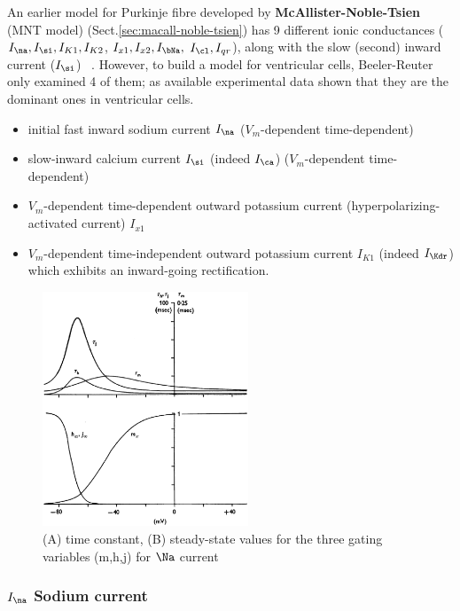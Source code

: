 An earlier model for Purkinje fibre developed by {\bf McAllister-Noble-Tsien}
(MNT model) (Sect.\ref{sec:macall-noble-tsien}) has 9 different ionic
conductances ($I_\na, I_\si, I_{K1}, I_{K2}$, $I_{x1}, I_{x2}, I_\bNa,$
$I_{\cl}, I_{qr}$), along with the slow (second) inward current ($I_\si$)
~\citep{mcallister1975rea}.  However, to build a model for ventricular cells,
Beeler-Reuter only examined 4 of them; as available experimental data shown that
they are the dominant ones in ventricular cells.
\begin{itemize}
\item initial fast inward sodium current $I_\na$ ($V_m$-dependent
time-dependent)
\item slow-inward calcium current $I_\si$ (indeed $I_\ca$) ($V_m$-dependent
time-dependent) 
\item $V_m$-dependent time-dependent outward potassium current
(hyperpolarizing-activated current) $I_{x1}$
\item $V_m$-dependent time-independent outward potassium current
  $I_{K1}$ (indeed $I_\Kdr$) which exhibits an inward-going rectification.
\end{itemize}


\begin{figure}[hbt]
  \centerline{\includegraphics[height=7cm,
    angle=0]{./images/BR_mhj.eps}}
  \caption{(A) time constant, (B) steady-state values for the three
    gating variables (m,h,j) for $\Na$ current}
  \label{fig:BR_mhj}
\end{figure}

\subsubsection{$I_\na$ Sodium current}

